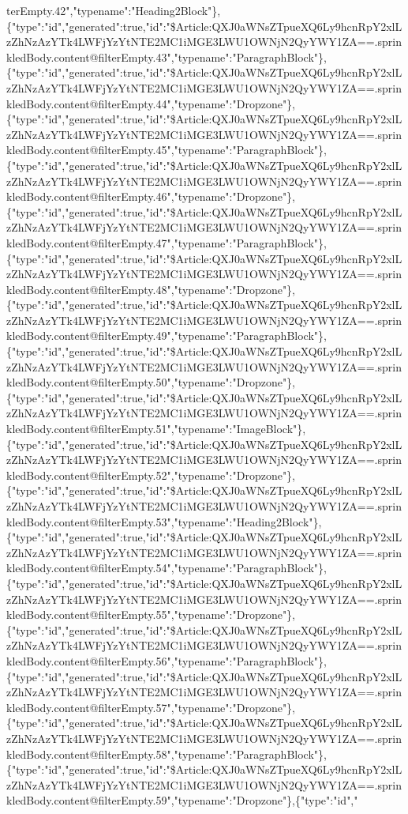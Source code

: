 terEmpty.42","typename":"Heading2Block"\},\{"type":"id","generated":true,"id":"\$Article:QXJ0aWNsZTpueXQ6Ly9hcnRpY2xlLzZhNzAzYTk4LWFjYzYtNTE2MC1iMGE3LWU1OWNjN2QyYWY1ZA==.sprinkledBody.content@filterEmpty.43","typename":"ParagraphBlock"\},\{"type":"id","generated":true,"id":"\$Article:QXJ0aWNsZTpueXQ6Ly9hcnRpY2xlLzZhNzAzYTk4LWFjYzYtNTE2MC1iMGE3LWU1OWNjN2QyYWY1ZA==.sprinkledBody.content@filterEmpty.44","typename":"Dropzone"\},\{"type":"id","generated":true,"id":"\$Article:QXJ0aWNsZTpueXQ6Ly9hcnRpY2xlLzZhNzAzYTk4LWFjYzYtNTE2MC1iMGE3LWU1OWNjN2QyYWY1ZA==.sprinkledBody.content@filterEmpty.45","typename":"ParagraphBlock"\},\{"type":"id","generated":true,"id":"\$Article:QXJ0aWNsZTpueXQ6Ly9hcnRpY2xlLzZhNzAzYTk4LWFjYzYtNTE2MC1iMGE3LWU1OWNjN2QyYWY1ZA==.sprinkledBody.content@filterEmpty.46","typename":"Dropzone"\},\{"type":"id","generated":true,"id":"\$Article:QXJ0aWNsZTpueXQ6Ly9hcnRpY2xlLzZhNzAzYTk4LWFjYzYtNTE2MC1iMGE3LWU1OWNjN2QyYWY1ZA==.sprinkledBody.content@filterEmpty.47","typename":"ParagraphBlock"\},\{"type":"id","generated":true,"id":"\$Article:QXJ0aWNsZTpueXQ6Ly9hcnRpY2xlLzZhNzAzYTk4LWFjYzYtNTE2MC1iMGE3LWU1OWNjN2QyYWY1ZA==.sprinkledBody.content@filterEmpty.48","typename":"Dropzone"\},\{"type":"id","generated":true,"id":"\$Article:QXJ0aWNsZTpueXQ6Ly9hcnRpY2xlLzZhNzAzYTk4LWFjYzYtNTE2MC1iMGE3LWU1OWNjN2QyYWY1ZA==.sprinkledBody.content@filterEmpty.49","typename":"ParagraphBlock"\},\{"type":"id","generated":true,"id":"\$Article:QXJ0aWNsZTpueXQ6Ly9hcnRpY2xlLzZhNzAzYTk4LWFjYzYtNTE2MC1iMGE3LWU1OWNjN2QyYWY1ZA==.sprinkledBody.content@filterEmpty.50","typename":"Dropzone"\},\{"type":"id","generated":true,"id":"\$Article:QXJ0aWNsZTpueXQ6Ly9hcnRpY2xlLzZhNzAzYTk4LWFjYzYtNTE2MC1iMGE3LWU1OWNjN2QyYWY1ZA==.sprinkledBody.content@filterEmpty.51","typename":"ImageBlock"\},\{"type":"id","generated":true,"id":"\$Article:QXJ0aWNsZTpueXQ6Ly9hcnRpY2xlLzZhNzAzYTk4LWFjYzYtNTE2MC1iMGE3LWU1OWNjN2QyYWY1ZA==.sprinkledBody.content@filterEmpty.52","typename":"Dropzone"\},\{"type":"id","generated":true,"id":"\$Article:QXJ0aWNsZTpueXQ6Ly9hcnRpY2xlLzZhNzAzYTk4LWFjYzYtNTE2MC1iMGE3LWU1OWNjN2QyYWY1ZA==.sprinkledBody.content@filterEmpty.53","typename":"Heading2Block"\},\{"type":"id","generated":true,"id":"\$Article:QXJ0aWNsZTpueXQ6Ly9hcnRpY2xlLzZhNzAzYTk4LWFjYzYtNTE2MC1iMGE3LWU1OWNjN2QyYWY1ZA==.sprinkledBody.content@filterEmpty.54","typename":"ParagraphBlock"\},\{"type":"id","generated":true,"id":"\$Article:QXJ0aWNsZTpueXQ6Ly9hcnRpY2xlLzZhNzAzYTk4LWFjYzYtNTE2MC1iMGE3LWU1OWNjN2QyYWY1ZA==.sprinkledBody.content@filterEmpty.55","typename":"Dropzone"\},\{"type":"id","generated":true,"id":"\$Article:QXJ0aWNsZTpueXQ6Ly9hcnRpY2xlLzZhNzAzYTk4LWFjYzYtNTE2MC1iMGE3LWU1OWNjN2QyYWY1ZA==.sprinkledBody.content@filterEmpty.56","typename":"ParagraphBlock"\},\{"type":"id","generated":true,"id":"\$Article:QXJ0aWNsZTpueXQ6Ly9hcnRpY2xlLzZhNzAzYTk4LWFjYzYtNTE2MC1iMGE3LWU1OWNjN2QyYWY1ZA==.sprinkledBody.content@filterEmpty.57","typename":"Dropzone"\},\{"type":"id","generated":true,"id":"\$Article:QXJ0aWNsZTpueXQ6Ly9hcnRpY2xlLzZhNzAzYTk4LWFjYzYtNTE2MC1iMGE3LWU1OWNjN2QyYWY1ZA==.sprinkledBody.content@filterEmpty.58","typename":"ParagraphBlock"\},\{"type":"id","generated":true,"id":"\$Article:QXJ0aWNsZTpueXQ6Ly9hcnRpY2xlLzZhNzAzYTk4LWFjYzYtNTE2MC1iMGE3LWU1OWNjN2QyYWY1ZA==.sprinkledBody.content@filterEmpty.59","typename":"Dropzone"\},\{"type":"id","